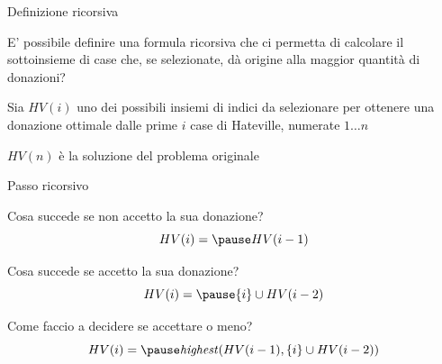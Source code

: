 \begin{frame}{Definizione ricorsiva}

\vspace{-9pt}
\begin{myboxtitle}
E' possibile definire una formula ricorsiva che ci permetta di calcolare
il sottoinsieme di case che, se selezionate, dà origine alla maggior quantità di donazioni?
\end{myboxtitle}

\bigskip
{}
\BIL
\item Sia $HV(i)$ uno dei possibili insiemi di indici da selezionare per ottenere una donazione ottimale dalle prime $i$ case di Hateville, numerate $1 \ldots n$ 
\item $HV(n)$ è la soluzione del problema originale
\EIL

\end{frame}

\begin{frame}{Passo ricorsivo}

\vspace{-9pt}
\BI
\item Cosa succede se non accetto la sua donazione?
\EI
\[
HV(i) = \pause HV(i-1)
\]

\BI
\item Cosa succede se accetto la sua donazione?
\EI
\[
HV(i) = \pause \{ i \} \cup HV(i-2)  
\]

\BI
\item Come faccio a decidere se accettare o meno?
\EI
\[
HV(i) = \pause \mathit{highest}(HV(i-1), \{ i \} \cup HV(i-2)  )
\]

\end{frame}

